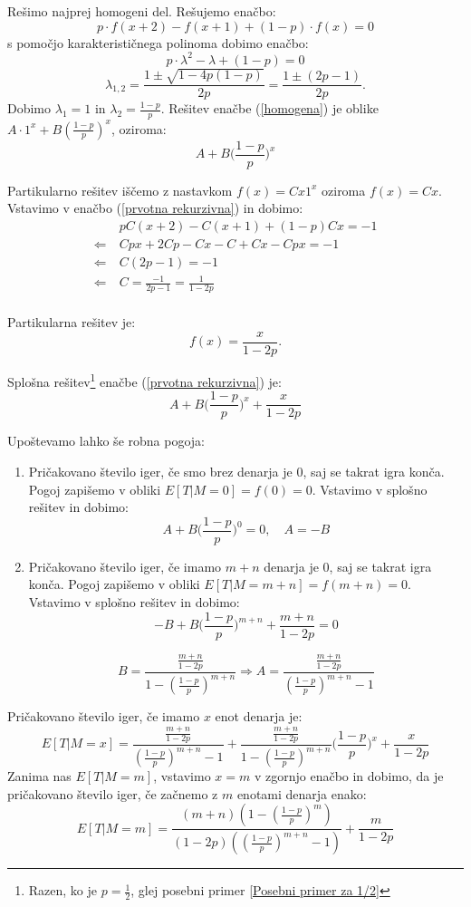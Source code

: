 \documentclass[12pt, a4paper]{article}
\begin{document}
Rešimo najprej homogeni del. Rešujemo enačbo: 
\begin{equation}
\label{homogena}
p\cdot f(x+2) - f(x+1) + (1-p)\cdot f(x) = 0
\end{equation}
 s pomočjo karakterističnega polinoma dobimo enačbo: $$p\cdot  \lambda ^2 - \lambda + (1-p) = 0$$ $$\lambda _{1, 2}= \frac{1 \pm \sqrt{1 - 4p(1-p)}}{2p} = \frac{1 \pm (2p-1)}{2p}.$$
Dobimo $\lambda _{1} = 1$ in $\lambda _{2} = \frac{1-p}{p}$. Rešitev enačbe (\ref{homogena}) je oblike $A\cdot 1^x + B(\frac{1-p}{p})^x$, oziroma: $$A+ B \bigg( \frac{1-p}{p} \bigg )^x $$

Partikularno rešitev iščemo z nastavkom $f(x)= Cx1^x$ oziroma $f(x)= Cx$. Vstavimo v enačbo (\ref{prvotna rekurzivna}) in dobimo: 
\begin{equation*}
\begin{split}
 &~pC(x+2)-C(x+1)+(1-p)Cx=-1\\
\Leftarrow & ~Cpx+2Cp-Cx-C+Cx-Cpx=-1 \\
\Leftarrow & ~C(2p-1)=-1\\
\Leftarrow & ~C=\frac{-1}{2p-1} = \frac{1}{1-2p}\\
\end{split}
\end{equation*}
 
Partikularna rešitev je: $$f(x)=\frac{x}{1-2p}.$$

Splošna rešitev\footnote{Razen, ko je $p=\frac{1}{2}$, glej posebni primer \ref{Posebni primer za 1/2} } enačbe (\ref{prvotna rekurzivna}) je: $$A + B\bigg( \frac{1-p}{p} \bigg )^x+\frac{x}{1-2p}$$

Upoštevamo lahko še robna pogoja:
\begin{enumerate}
\item Pričakovano število iger, če smo brez denarja je 0, saj se takrat igra konča. Pogoj zapišemo v obliki $E[T|M= 0] = f(0) = 0$. Vstavimo v splošno rešitev in dobimo:
$$A + B\bigg( \frac{1-p}{p} \bigg )^0 = 0, \quad A = -B$$
\item Pričakovano število iger, če imamo $m+n$ denarja je 0, saj se takrat igra konča. Pogoj zapišemo v obliki $E[T|M= m+n] = f(m+n) = 0$. Vstavimo v splošno rešitev in dobimo:
$$-B + B\bigg( \frac{1-p}{p} \bigg )^{m+n}+\frac{m+n}{1-2p}=0$$

$$B = \frac{\frac{m+n}{1-2p}}{1- \left(\frac{1-p}{p}\right)^{m+n}} \Rightarrow A = \frac{\frac{m+n}{1-2p}}{\left(\frac{1-p}{p}\right)^{m+n}-1}$$
\end{enumerate}

Pričakovano število iger, če imamo $x$ enot denarja je: $$E[ T | M = x]= \frac{\frac{m+n}{1-2p}}{\left(\frac{1-p}{p}\right)^{m+n}-1} + \frac{\frac{m+n}{1-2p}}{1- \left(\frac{1-p}{p}\right)^{m+n}}\bigg( \frac{1-p}{p} \bigg )^x+\frac{x}{1-2p}$$
 Zanima nas $E[T|M=m]$, vstavimo $x=m$ v zgornjo enačbo in dobimo, da je pričakovano število iger, če začnemo z $m$ enotami denarja enako: $$E[T|M=m]=\frac{(m+n) \left(1-\left(\frac{1-p}{p}\right)^m\right)}{(1-2 p)
   \left(\left(\frac{1-p}{p}\right)^{m+n}-1\right)}+\frac{m}{1-2 p}$$
\end{document}
